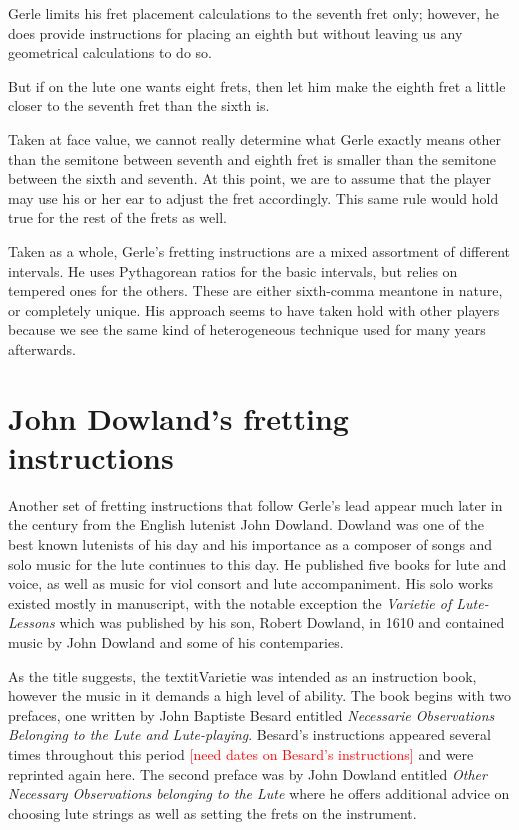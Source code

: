 Gerle limits his fret placement calculations to the seventh fret only; however,
he does provide instructions for placing an eighth but without leaving us any
geometrical calculations to do so.
\begin{blocks}
But if on the lute one wants eight frets, then let him make the eighth fret a
little closer to the seventh fret than the sixth is.
\end{blocks}
Taken at face value, we cannot really determine what Gerle exactly means other
than the semitone between seventh and eighth fret is smaller than the semitone
between the sixth and seventh.  At this point, we are to assume that the player
may use his or her ear to adjust the fret accordingly.  This same rule would
hold true for the rest of the frets as well.

Taken as a whole, Gerle's fretting instructions are a mixed assortment of different
intervals.  He uses Pythagorean ratios for the basic intervals, but relies on tempered
ones for the others.  These are either sixth-comma meantone in nature, or completely
unique.  His approach seems to have taken hold with other players because we see the
same kind of heterogeneous technique used for many years afterwards.

%
%
\section{John Dowland's fretting instructions}

Another set of fretting instructions that follow Gerle's lead appear much later in the
century from the English lutenist John Dowland. Dowland was one of the best known
lutenists of his day and his importance as a composer of songs and solo music for the
lute continues to this day. He published five books for lute and voice, as well as
music for viol consort and lute accompaniment.  His solo works existed mostly in
manuscript, with the notable exception the \textit{Varietie of Lute-Lessons} which was
published by his son, Robert Dowland, in 1610 and contained music by John Dowland and
some of his contemparies.

As the title suggests, the textit{Varietie} was intended as an instruction book,
however the music in it demands a high level of ability.  The book begins
with two prefaces, one written by John Baptiste Besard entitled \textit{Necessarie
Observations Belonging to the Lute and Lute-playing}. Besard's instructions appeared
several times throughout this period \textcolor{red}{[need dates on Besard's
instructions]} and were reprinted again here.  The second preface was by John Dowland
entitled \textit{ Other Necessary Observations belonging to the Lute} where he offers
additional advice on choosing lute strings as well as setting the frets on the
instrument.

